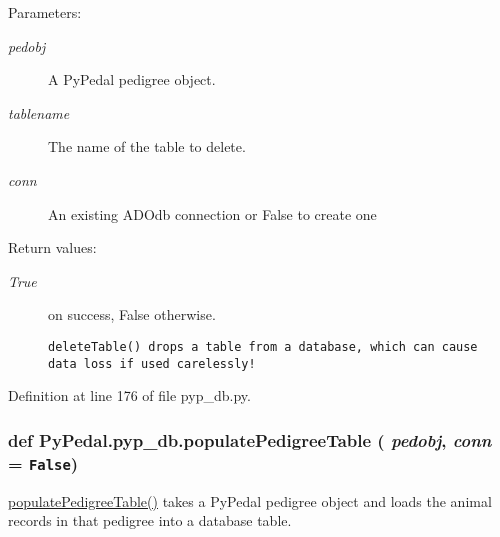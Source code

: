 \begin{Desc}
\item[Parameters:]
\begin{description}
\item[{\em pedobj}]A Py\-Pedal pedigree object. \item[{\em tablename}]The name of the table to delete. \item[{\em conn}]An existing ADOdb connection or False to create one \end{description}
\end{Desc}
\begin{Desc}
\item[Return values:]
\begin{description}
\item[{\em True}]on success, False otherwise.

\footnotesize\begin{verbatim}deleteTable() drops a table from a database, which can cause data loss if used carelessly!
\end{verbatim}
\normalsize
 \end{description}
\end{Desc}


Definition at line 176 of file pyp\_\-db.py.\hypertarget{namespacePyPedal_1_1pyp__db_bdfacecb7932eb4036f2dcfb4c39a534}{
\subsubsection[populatePedigreeTable]{\setlength{\rightskip}{0pt plus 5cm}def Py\-Pedal.pyp\_\-db.populate\-Pedigree\-Table ( {\em pedobj},  {\em conn} = {\tt False})}}
\label{namespacePyPedal_1_1pyp__db_bdfacecb7932eb4036f2dcfb4c39a534}


\hyperlink{namespacePyPedal_1_1pyp__db_bdfacecb7932eb4036f2dcfb4c39a534}{populate\-Pedigree\-Table()} takes a Py\-Pedal pedigree object and loads the animal records in that pedigree into a database table. 

